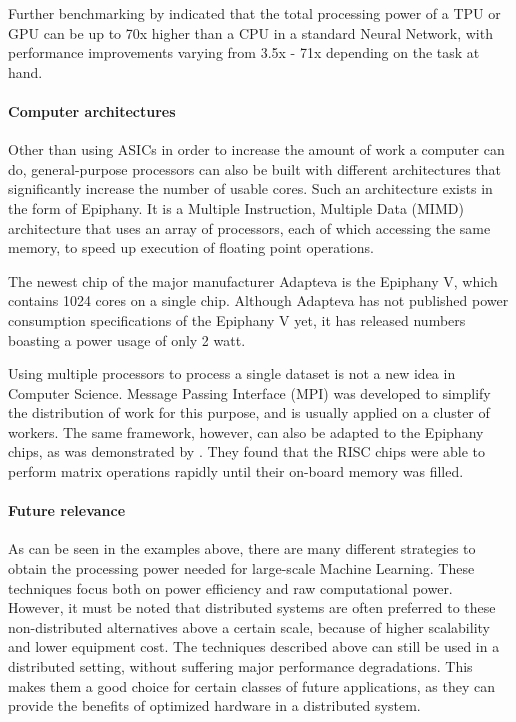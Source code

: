 Further benchmarking by \citet{Sato17} indicated that the total processing power of a TPU or GPU can be up to 70x higher than a CPU in a standard Neural Network, with performance improvements varying from 3.5x - 71x depending on the task at hand.


\paragraph{Computer architectures}
Other than using ASICs in order to increase the amount of work a computer can do,
general-purpose processors can also be built with different architectures that significantly increase the number of usable cores. Such an architecture exists in the form of Epiphany. It is a Multiple Instruction, Multiple Data (MIMD) architecture that uses an array of processors, each of which accessing the
same memory, to speed up execution of floating point operations\cite{Olof16}.

The newest chip of the major manufacturer Adapteva is the Epiphany V, which contains
1024 cores on a single chip\cite{Olof16}. Although Adapteva has not published power consumption specifications of the Epiphany V yet, it has released numbers boasting a power usage of only 2 watt\cite{Adap}.

Using multiple processors to process a single dataset is not a new idea in Computer Science. Message Passing Interface (MPI)\cite{MPI1993} was developed to simplify the distribution of work for this purpose, and is usually applied on a cluster of workers. The same framework, however, can also be adapted to the Epiphany chips, as was demonstrated by \citep{Rich15}. They found that the RISC chips were able to perform matrix operations rapidly until their on-board memory was filled.

\paragraph{Future relevance}
As can be seen in the examples above, there are many different strategies to obtain the processing power needed for large-scale Machine Learning. These techniques focus both on power efficiency and raw computational power. However, it must be noted that distributed systems are often preferred to these non-distributed alternatives above a certain scale, because of higher scalability and lower equipment cost. The techniques described above can still be used in a distributed setting, without suffering major performance degradations. This makes them a good choice for certain classes of future applications, as they can provide the benefits of optimized hardware in a distributed system.
